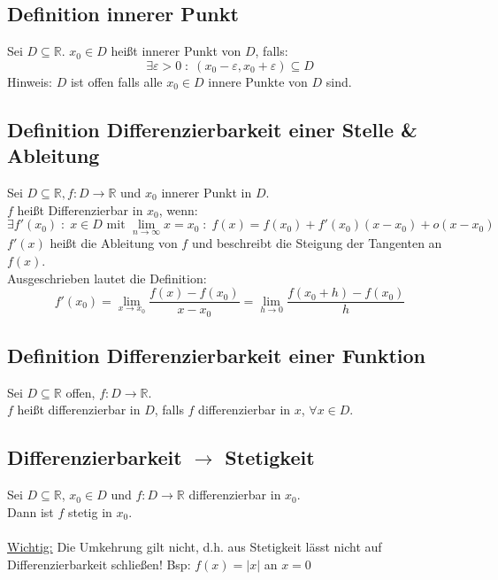 \documentclass[halfparscip]{scrartcl}
\newcounter{subsection2}
\begin{document}
\subsection{Definition innerer Punkt}
Sei $D \subseteq \mathbb{R}$. $x_0 \in D$ heißt innerer Punkt von $D$, falls:
\begin{equation*}
	\exists \varepsilon > 0 \;:\; (x_0 - \varepsilon, x_0 + \varepsilon) \subseteq D
\end{equation*}
Hinweis: $D$ ist offen falls alle $x_0 \in D$ innere Punkte von $D$ sind.

\subsection{Definition Differenzierbarkeit einer Stelle \& Ableitung}
Sei $D \subseteq \mathbb{R}, f: D \rightarrow \mathbb{R}$ und $x_0$ innerer Punkt in $D$.\\
$f$ heißt Differenzierbar in $x_0$, wenn:
\begin{equation*}
	\exists f'(x_0) \;:\; x \in D \text{ mit } \lim_{n \rightarrow \infty}x = x_0 \;:\; f(x) = f(x_0) + f'(x_0)(x-x_0)+o(x-x_0)
\end{equation*}
$f'(x)$ heißt die Ableitung von $f$ und beschreibt die Steigung der Tangenten an $f(x)$.\\
Ausgeschrieben lautet die Definition:
\begin{equation*}
	f'(x_0) = \lim_{x\rightarrow x_0} \frac{f(x) - f(x_0)}{x - x_0} = \lim_{h\rightarrow 0} \frac{f(x_0 + h) - f(x_0)}{h}
\end{equation*}

\subsection{Definition Differenzierbarkeit einer Funktion}
Sei $D \subseteq \mathbb{R}$ offen, $f : D \rightarrow \mathbb{R}$.\\
$f$ heißt differenzierbar in $D$, falls $f$ differenzierbar in $x$, $\forall x \in D$.

\addtocounter{subsection}{2}
\subsection{Differenzierbarkeit $\rightarrow$ Stetigkeit}
Sei $D \subseteq \mathbb{R}$, $x_0 \in D$ und $f : D \rightarrow \mathbb{R}$ differenzierbar in $x_0$.\\
Dann ist $f$ stetig in $x_0$.\\\\
\underline{Wichtig:} Die Umkehrung gilt nicht, d.h. aus Stetigkeit lässt nicht auf Differenzierbarkeit schließen! Bsp: $f(x) = \vert x\vert$ an $x = 0$
\end{document}
